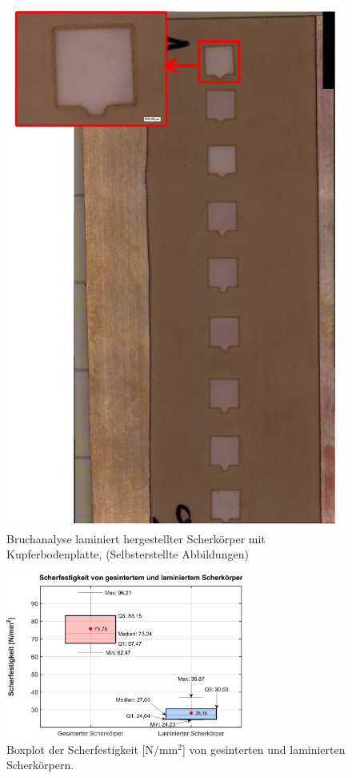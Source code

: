 \begin{figure}[H]
    \centering
    \includegraphics[scale=0.2]{Bilder/WhatsApp Image 2025-03-28 at 21.29.51.jpeg}
    \caption{Bruchanalyse laminiert hergestellter Scherkörper mit Kupferbodenplatte, (Selbsterstellte Abbildungen)}
    \label{}
\end{figure}

\begin{figure}[H]
    \centering
    \includegraphics[width=0.7\textwidth]{Bilder/boxplot_final.eps}
    \caption{Boxplot der Scherfestigkeit {[}N/mm$^2${]} von gesinterten und laminierten Scherkörpern.}
    \label{fig:boxplot}
\end{figure}




